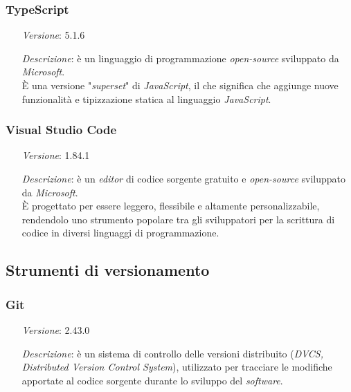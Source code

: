     \subsubsection*{TypeScript}
    \begin{itemize}[align=left]
        \item [\textit{Versione}:] 5.1.6
        \item [\textit{Descrizione}:] è un linguaggio di programmazione \textit{open-source} sviluppato da \textit{Microsoft}. \\
                È una versione "\textit{superset}" di \textit{JavaScript}, il che significa che aggiunge nuove funzionalità e tipizzazione statica al linguaggio \textit{JavaScript}.
    \end{itemize}

    \subsubsection*{Visual Studio Code}
    \begin{itemize}[align=left]
        \item [\textit{Versione}:] 1.84.1
        \item [\textit{Descrizione}:] è un \textit{editor} di codice sorgente gratuito e \textit{open-source} sviluppato da \textit{Microsoft}. \\
                È progettato per essere leggero, flessibile e altamente personalizzabile, rendendolo uno strumento popolare tra gli sviluppatori per la scrittura di codice in diversi linguaggi di programmazione.
    \end{itemize}


\subsection{Strumenti di versionamento}
    \subsubsection*{Git}
    \begin{itemize}[align=left]
        \item [\textit{Versione}:] 2.43.0
        \item [\textit{Descrizione}:] è un sistema di controllo delle versioni distribuito (\textit{DVCS, Distributed Version Control System}), utilizzato per tracciare le modifiche apportate al codice sorgente durante lo sviluppo del \textit{software}.
    \end{itemize}

